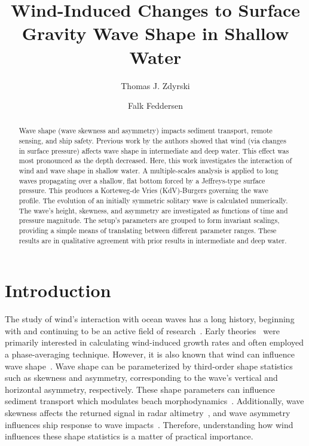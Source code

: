 \documentclass{jfm}
\title{Wind-Induced Changes to Surface Gravity Wave Shape in Shallow Water}
\author{Thomas J. Zdyrski \and Falk Feddersen}
\begin{document}
\maketitle

\begin{abstract}
Wave shape (\eg wave skewness and asymmetry) impacts sediment transport,
remote sensing, and ship safety.
Previous work by the authors showed that wind (via changes in surface
pressure) affects wave shape in intermediate and deep water.
This effect was most pronounced as the depth decreased.
Here, this work investigates the interaction of wind and wave shape in
shallow water.
A multiple-scales analysis is applied to long waves propagating over a
shallow, flat bottom forced by a Jeffreys-type surface pressure.
This produces a Korteweg-de Vries (KdV)-Burgers governing the wave
profile.
The evolution of an initially symmetric solitary wave is calculated
numerically.
The wave's height, skewness, and asymmetry are investigated as functions
of time and pressure magnitude.
The setup's parameters are grouped to form invariant scalings,
providing a simple means of translating between different parameter
ranges.
These results are in qualitative agreement with prior results in
intermediate and deep water.
\end{abstract}

\section{Introduction}

The study of wind's interaction with ocean waves has a long history, beginning
with \citet{jeffreys1925formation} and continuing to be an active field
of
research~\citep[\eg][]{banner1976separation,touboul2006interaction,tian2013evolution}.
Early
theories~\citep[\eg][]{jeffreys1925formation,miles1957generation,phillips1957generation}
were primarily interested in calculating wind-induced growth rates
and often employed a phase-averaging technique.
However, it is also known that wind can influence wave
shape~\citep[\eg][]{leykin1995asymmetry,feddersen2005wind,zdyrski2020wind}.
Wave shape can be parameterized by third-order shape statistics such as
skewness and asymmetry, corresponding to the wave's vertical and
horizontal asymmetry, respectively.
These shape parameters can influence sediment transport \citep[\eg][]{drake2001discrete,
gonzalez2007seabed} which modulates beach
morphodynamics~\citep[\eg][]{hoefel2003wave}.
Additionally, wave skewness affects the returned signal in radar
altimetry~\citep[\eg][]{hayne1980radar,huang1983non},
and wave asymmetry influences ship response to wave
impacts~\citep[\eg][]{soares2008abnormal,oberhagemann2013prediction}.
Therefore, understanding how wind influences these shape statistics is a
matter of practical importance.
\end{document}

